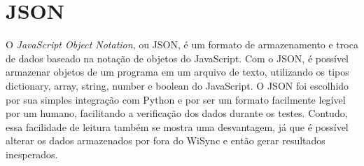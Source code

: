 \section {JSON}
O \textit{JavaScript Object Notation}, ou JSON\cite{json}, é um formato de armazenamento e troca de dados baseado na notação de objetos do JavaScript. Com o JSON, é possível armazenar objetos de um programa em um arquivo de texto, utilizando os tipos dictionary, array, string, number e boolean do JavaScript.
O JSON foi escolhido por sua simples integração com Python e por ser um formato facilmente legível por um humano, facilitando a verificação dos dados durante os testes.
Contudo, essa facilidade de leitura também se mostra uma desvantagem, já que é possível alterar os dados armazenados por fora do WiSync e então gerar resultados inesperados.